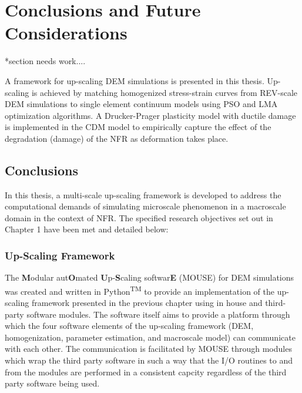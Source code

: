 \chapter{Conclusions and Future Considerations}

*section needs work....

A framework for up-scaling DEM simulations is presented in this thesis. Up-scaling is achieved by matching homogenized stress-strain curves from REV-scale DEM simulations to single element continuum models using PSO and LMA optimization algorithms. A Drucker-Prager plasticity model with ductile damage is implemented in the CDM model to empirically capture the effect of the degradation (damage) of the NFR as deformation takes place.

\section{Conclusions}

In this thesis, a multi-scale up-scaling framework is developed to address the computational demands of simulating microscale phenomenon in a macroscale domain in the context of NFR. The specified research objectives set out in Chapter 1 have been met and detailed below:

\subsection*{Up-Scaling Framework}

The \textbf{M}odular aut\textbf{O}mated \textbf{U}p-\textbf{S}caling softwar\textbf{E} (MOUSE) for DEM simulations was created and written in Python\textsuperscript{TM} to provide an implementation of the up-scaling framework presented in the previous chapter using in house and third-party software modules. The software itself aims to provide a platform through which the four software elements of the up-scaling framework (DEM, homogenization, parameter estimation, and macroscale model) can communicate with each other. The communication is facilitated by MOUSE through modules which wrap the third party software in such a way that the I/O routines to and from the modules are performed in a consistent capcity regardless of the third party software being used. 

